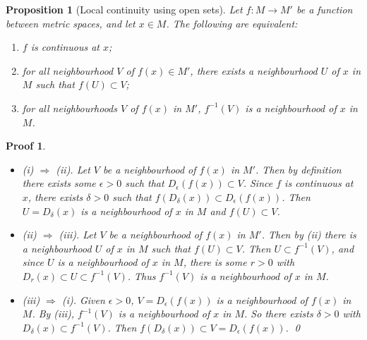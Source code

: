 \documentclass{article}
\theoremstyle{plain}\theoremheaderfont{\normalfont\itshape}\theorembodyfont{\rmfamily}\theoremseparator{.}\newtheorem*{rem}{Remark}\newtheorem*{ex}{Example}\newtheorem*{proof}{Proof}\newtheorem*{altp}{Alternative proof}
\theoremstyle{plain}\theoremheaderfont{\normalfont\bfseries}\theorembodyfont{\rmfamily}\theoremseparator{.}\newtheorem{thm}{Theorem}[section]\newtheorem{lem}[thm]{Lemma}\newtheorem{prop}[thm]{Proposition}\newtheorem*{cor}{Corollary}\newtheorem{defn}[thm]{Definition}\newtheorem{clm}[thm]{Claim}\newtheorem{clminproof}{Claim}
\theoremstyle{break}\theoremheaderfont{\normalfont\itshape}\theorembodyfont{\rmfamily}\theoremseparator{.\medskip}\newtheorem*{proofskip}{Proof}\newtheorem*{exs}{Examples}\newtheorem*{rems}{Remarks}
\theoremstyle{break}\theoremheaderfont{\normalfont\bfseries}\theorembodyfont{\rmfamily}\theoremseparator{.\medskip}\newtheorem{lemskip}[thm]{Lemma}\newtheorem{defnskip}[thm]{Definition}\newtheorem{propskip}[thm]{Proposition}\newtheorem{thmskip}[thm]{Theorem}
\newcommand{\qed}{\hfill\ensuremath{\Box}}
\begin{document}
    \begin{prop}[Local continuity using open sets]
        Let \(f:M\to M'\) be a function between metric spaces, and let \(x\in M\). The following are equivalent:
        \begin{enumerate}[label=(\roman*),topsep=0pt]
            \item \(f\) is continuous at \(x\);
            \item for all neighbourhood \(V\) of \(f(x)\in M'\), there exists a neighbourhood \(U\) of \(x\) in \(M\) such that \(f(U)\subset V\);
            \item for all neighbourhoods \(V\) of \(f(x)\) in \(M'\), \(f^{-1}(V)\) is a neighbourhood of \(x\) in \(M\).
        \end{enumerate}
    \end{prop}
    \begin{proofskip}
        \begin{itemize}[topsep=0pt]
            \item (i) \(\Rightarrow\) (ii). Let \(V\) be a neighbourhood of \(f(x)\) in \(M'\). Then by definition there exists some \(\epsilon>0\) such that \(D_{\epsilon}(f(x))\subset V\). Since \(f\) is continuous at \(x\), there exists \(\delta>0\) such that \(f(D_\delta(x))\subset D_\epsilon(f(x))\). Then \(U=D_\delta(x)\) is a neighbourhood of \(x\) in \(M\) and \(f(U)\subset V\).
            \item (ii) \(\Rightarrow\) (iii). Let \(V\) be a neighbourhood of \(f(x)\) in \(M'\). Then by (ii) there is a neighbourhood \(U\) of \(x\) in \(M\) such that \(f(U)\subset V\). Then \(U\subset f^{-1}(V)\), and since \(U\) is a neighbourhood of \(x\) in \(M\), there is some \(r>0\) with \(D_r(x)\subset U\subset f^{-1}(V)\). Thus \(f^{-1}(V)\) is a neighbourhood of \(x\) in \(M\).
            \item (iii) \(\Rightarrow\) (i). Given \(\epsilon>0\), \(V=D_\epsilon(f(x))\) is a neighbourhood of \(f(x)\) in \(M\). By (iii), \(f^{-1}(V)\) is a neighbourhood of \(x\) in \(M\). So there exists \(\delta>0\) with \(D_\delta(x)\subset f^{-1}(V)\). Then \(f(D_\delta(x))\subset V=D_\epsilon(f(x))\).
            \qed
        \end{itemize}
    \end{proofskip}
\end{document}
